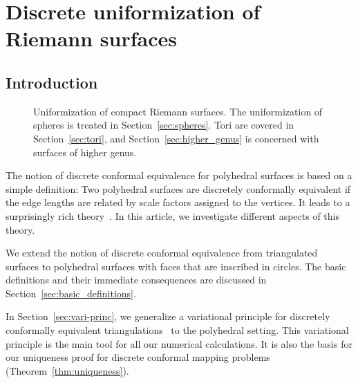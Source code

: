 \documentclass[Thesis]{subfiles}
\begin{document}

\chapter{Discrete uniformization of Riemann surfaces}
\label{chp:uniformization}

\section{Introduction}

\begin{figure}
\centering
{}
\caption{
Uniformization of compact Riemann surfaces. 
The uniformization of spheres is treated in
Section~\ref{sec:spheres}. Tori are covered in
Section~\ref{sec:tori}, and Section~\ref{sec:higher_genus} is
concerned with surfaces of higher genus.
}
\label{fig:intro_uniformization}
\end{figure}

The notion of discrete conformal equivalence for polyhedral surfaces
is based on a simple definition: Two polyhedral surfaces are
discretely conformally equivalent if the edge lengths are related by
scale factors assigned to the vertices. It leads to a surprisingly
rich theory~\cite{Luo2004:Yamabe, BPS2015:dconf, Luo-Uniformization, Luo-Uniformization_II}. In this
article, we investigate different aspects of this theory.

We extend the notion of discrete conformal equivalence from
triangulated surfaces to polyhedral surfaces with faces that are
inscribed in circles. The basic definitions and their immediate
consequences are discussed in Section~\ref{sec:basic_definitions}. 

In Section~\ref{sec:vari-princ}, we generalize a variational principle
for discretely conformally equivalent
triangulations~\cite{BPS2015:dconf} to the polyhedral setting. This
variational principle is the main tool for all our numerical
calculations. It is also the basis for our uniqueness proof for
discrete conformal mapping problems
(Theorem~\ref{thm:uniqueness}). 
\end{document}
